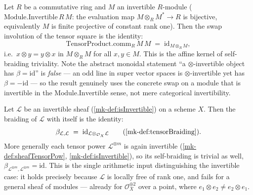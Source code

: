 \begin{lemma}
  \label{mk-lem:tensorProductComm_eq_refl_mathlib}
  \mathlibok

  Let \(R\) be a commutative ring and \(M\) an invertible \(R\)-module
  (\(\mathrm{Module.Invertible}\,R\,M\): the evaluation map
  \(M \otimes_R M^{\ast} \to R\) is bijective, equivalently \(M\) is finite
  projective of constant rank one). Then the swap involution of the tensor square
  is the identity:
  \[
    \mathrm{TensorProduct.comm}_R\,M\,M \;=\;
      \mathrm{id}_{M \otimes_R M},
  \]
  i.e.\ \(x \otimes y = y \otimes x\) in \(M \otimes_R M\) for all
  \(x, y \in M\). This is the affine kernel of self-braiding triviality. Note the
  abstract monoidal statement ``a \(\otimes\)-invertible object has
  \(\beta = \mathrm{id}\)'' is \emph{false} --- an odd line in super vector spaces
  is \(\otimes\)-invertible yet has \(\beta = -\mathrm{id}\) --- so the result
  genuinely uses the concrete swap on a module that is invertible in the
  \(\mathrm{Module.Invertible}\) sense, not mere categorical invertibility.
\end{lemma}

\begin{lemma}\label{mk-lem:braiding_eq_id_of_invertible}
  \leanok

  Let \(\mathcal{L}\) be an invertible sheaf (\ref{mk-def:isInvertible}) on a scheme
  \(X\). Then the braiding of \(\mathcal{L}\) with itself is the identity:
  \[
    \beta_{\mathcal{L},\mathcal{L}} \;=\;
      \mathrm{id}_{\mathcal{L} \otimes_{\mathcal{O}_X} \mathcal{L}}
    \qquad(\ref{mk-def:tensorBraiding}).
  \]
  More generally each tensor power \(\mathcal{L}^{\otimes m}\) is again invertible
  (\ref{mk-def:sheafTensorPow}, \ref{mk-def:isInvertible}), so its self-braiding is
  trivial as well, \(\beta_{\mathcal{L}^{\otimes m},\mathcal{L}^{\otimes m}} =
  \mathrm{id}\). This is the single arithmetic input distinguishing the invertible
  case: it holds precisely because \(\mathcal{L}\) is locally free of rank one, and
  fails for a general sheaf of modules --- already for
  \(\mathcal{O}_X^{\oplus 2}\) over a point, where
  \(e_1 \otimes e_2 \neq e_2 \otimes e_1\).
\end{lemma}

